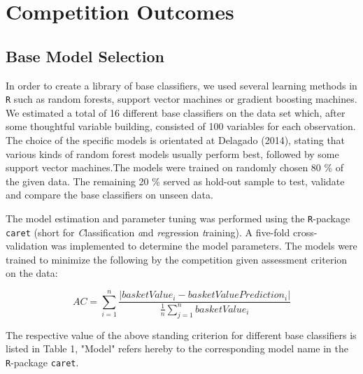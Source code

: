 \documentclass[12pt]{article}
\begin{document}
\section{Competition Outcomes}

\subsection{Base Model Selection}

In order to create a library of base classifiers, we used several learning methods in \texttt{R} such as random forests, support vector machines or gradient boosting machines. We estimated a total of 16 different base classifiers on the data set which, after some thoughtful variable building, consisted of 100 variables for each observation. The choice of the specific models is orientated at Delagado (2014), stating that various kinds of random forest models usually perform best, followed by some support vector machines.\cite{Fernandez-Delgado2014}The models were trained on randomly chosen 80 \% of the given data. The remaining 20 \% served as hold-out sample to test, validate and compare the base classifiers on unseen data.

The model estimation and parameter tuning was performed using the \texttt{R}-package \texttt{caret} (short for \textit{C}lassification \textit{a}nd \textit{re}gression \textit{t}raining). A five-fold cross-validation was implemented to determine the model parameters. The models were trained to minimize the following by the competition given assessment criterion on the data:

\[AC = \sum_{i=1}^n \frac{|basketValue_{i} - basketValuePrediction_{i}|}{\frac{1}{n} \sum_{j=1}^n basketValue_{i}}\]

The respective value of the above standing criterion for different base classifiers is listed in Table 1, "Model" refers hereby to the corresponding model name in the \texttt{R}-package \texttt{caret}.
\end{document}
